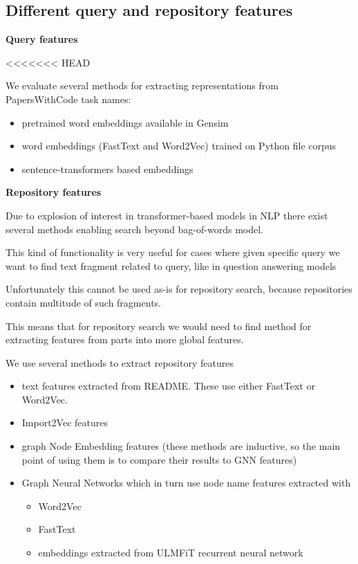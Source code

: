 \documentclass[longabstract,mgr,english]{iithesis}
\begin{document}
\subsection{Different query and repository features}

\textbf{Query features}

<<<<<<< HEAD

We evaluate several methods for extracting representations from PapersWithCode task names:
\begin{itemize}
\item pretrained word embeddings available in Gensim \cite{rehurek2011gensim}
\item word embeddings (FastText and Word2Vec) trained on Python file corpus
\item sentence-transformers based embeddings \cite{sentence_transformers}
\end{itemize}

\textbf{Repository features}

Due to explosion of interest in transformer-based models in NLP there exist several methods enabling search beyond bag-of-words model.

This kind of functionality is very useful for cases where given specific query we want to find text fragment related to query, like in question answering models

Unfortunately this cannot be used as-is for repository search, because repositories contain multitude of such fragments.

This means that for repository search we would need to find method  for extracting features from parts into more global features.

We use several methods to extract repository features
\begin{itemize}
    \item text features extracted from README. These use either FastText or Word2Vec.
    \item Import2Vec features
    \item graph Node Embedding features (these methods are inductive, so the main point of using them is to compare their results to GNN features)
    \item Graph Neural Networks which in turn use node name features extracted with 
      \begin{itemize}
        \item Word2Vec
        \item FastText
        \item {\color{red} embeddings extracted from ULMFiT recurrent neural network \cite{ulmfit}}
      \end{itemize}
\end{itemize}
\end{document}
